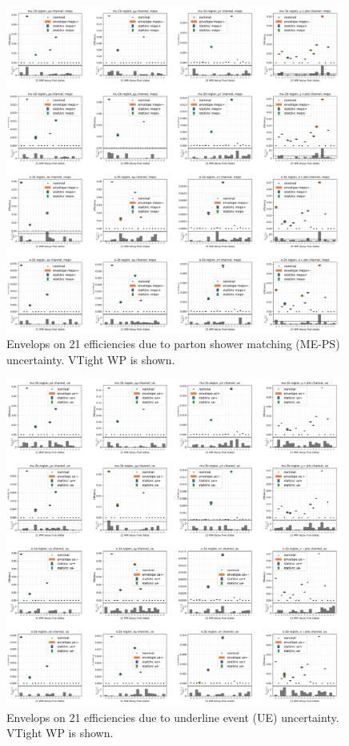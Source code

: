 \begin{figure}
    \centering
    \includegraphics[width=0.99\textwidth]{chapters/Analysis/sectionSystematics/figures/ttTheoretical/meps.png}
    \caption{Envelops on 21 efficiencies due to parton shower matching (ME-PS) uncertainty. VTight WP is shown.}
    \label{fig:analysis:systematics:effAfterCorrMEPS}
\end{figure}


\begin{figure}
    \centering
    \includegraphics[width=0.99\textwidth]{chapters/Analysis/sectionSystematics/figures/ttTheoretical/ue.png}
    \caption{Envelops on 21 efficiencies due to underline event (UE) uncertainty. VTight WP is shown.}
    \label{fig:analysis:systematics:effAfterCorrUE}
\end{figure}




